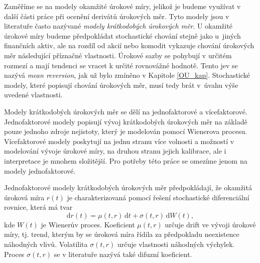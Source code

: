 \documentclass[a4paper,12pt]{report}
\theoremstyle{definition} \newtheorem{definice}[veta]{Definice}
\theoremstyle{remark}
\begin{document}
Zaměříme se na modely okamžité úrokové míry, jelikož je budeme využívat v další části práce při ocenění derivátů úrokových měr.
Tyto modely jsou v literatuře často nazývané \textit{modely krátkodobých úrokových měr}.
U okamžité úrokové míry budeme předpokládat stochastické chování stejně jako u~jiných finančních aktiv,
ale na rozdíl od akcií nebo komodit vykazuje chování úrokových měr následující příznačné vlastnosti. %
Úrokové sazby se pohybují v určitém rozmezí a %
mají tendenci se vracet k určité rovnovážné hodnotě.
Tento jev se nazývá \textit{mean reversion}, jak už bylo zmíněno v Kapitole \ref{OU_kap}. %
Stochastické modely, které popisují chování úrokových měr, musí tedy brát v~úvahu výše uvedené vlastnosti.


Modely krátkodobých úrokových měr se dělí na jednofaktorové a vícefaktorové.
Jednofaktorové modely popisují vývoj krátkodobých úrokových měr na základě pouze jednoho zdroje nejistoty, který je modelován pomocí Wienerova procesu.
Vícefaktorové modely poskytují na jednu stranu více volnosti a možností v modelování vývoje úrokové míry, na druhou stranu jejich kalibrace, ale i interpretace je mnohem složitější. 
Pro potřeby této práce se omezíme jenom na modely jednofaktorové. 

Jednofaktorové modely krátkodobých úrokových měr předpokládají, že okamžitá úroková míra $r(t)$ je charakterizovaná pomocí řešení stochastické diferenciální rovnice, která má tvar
\begin{equation}\label{model_urok_miry}
\mathrm{d}r(t)=\mu(t,r)\,\mathrm{d}t+\sigma(t,r)\,\mathrm{d}W(t),
\end{equation}
kde $W(t)$ je Wienerův proces.
Koeficient $\mu(t, r)$ určuje drift ve vývoji úrokové míry, tj. trend, kterým by se úroková míra řídila za předpokladu neexistence náhodných vlivů.
Volatilita $\sigma(t, r)$ určuje vlastnosti náhodných výchylek.
Proces $\sigma(t, r)$ se v literatuře nazývá také difuzní koeficient.
\end{document}
